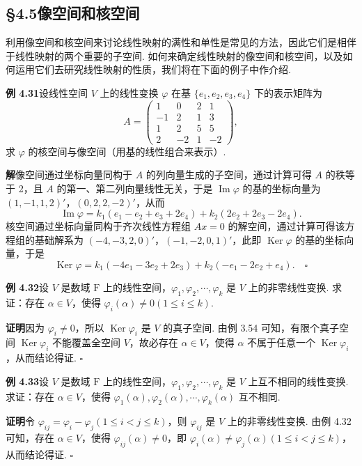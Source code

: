 \documentclass[UTF8,12pt,a4paper,fontset=fandol]{ctexart}
\begin{document}
\subsection*{§4.5\quad 像空间和核空间}

利用像空间和核空间来讨论线性映射的满性和单性是常见的方法，因此它们是相伴于线性映射的两个重要的子空间. 如何来确定线性映射的像空间和核空间，以及如何运用它们去研究线性映射的性质，我们将在下面的例子中作介绍.

\noindent\textbf{例 4.31}\quad 设线性空间 $V$ 上的线性变换 $\varphi$ 在基 $\{e_1,e_2,e_3,e_4\}$ 下的表示矩阵为
\[
A=\left(\begin{array}{rrrr}
1 & 0 & 2 & 1\\
-1 & 2 & 1 & 3\\
1 & 2 & 5 & 5\\
2 & -2 & 1 & -2
\end{array}\right),
\]
求 $\varphi$ 的核空间与像空间（用基的线性组合来表示）.

\noindent\textbf{解}\quad 像空间通过坐标向量同构于 $A$ 的列向量生成的子空间，通过计算可得 $A$ 的秩等于 2，且 $A$ 的第一、第二列向量线性无关，于是 $\operatorname{Im}\varphi$ 的基的坐标向量为 $(1,-1,1,2)'$，$(0,2,2,-2)'$，从而
\[
\operatorname{Im}\varphi=k_1(e_1-e_2+e_3+2e_4)+k_2(2e_2+2e_3-2e_4).
\]
核空间通过坐标向量同构于齐次线性方程组 $Ax=0$ 的解空间，通过计算可得该方程组的基础解系为 $(-4,-3,2,0)'$，$(-1,-2,0,1)'$，此即 $\operatorname{Ker}\varphi$ 的基的坐标向量，于是
\[
\operatorname{Ker}\varphi=k_1(-4e_1-3e_2+2e_3)+k_2(-e_1-2e_2+e_4). \quad \square
\]

\noindent\textbf{例 4.32}\quad 设 $V$ 是数域 $\mathrm{F}$ 上的线性空间，$\varphi_1,\varphi_2,\cdots,\varphi_k$ 是 $V$ 上的非零线性变换. 求证：存在 $\alpha\in V$，使得 $\varphi_i(\alpha)\ne0(1\le i\le k)$.

\noindent\textbf{证明}\quad 因为 $\varphi_i\ne0$，所以 $\operatorname{Ker}\varphi_i$ 是 $V$ 的真子空间. 由例 3.54 可知，有限个真子空间 $\operatorname{Ker}\varphi_i$ 不能覆盖全空间 $V$，故必存在 $\alpha\in V$，使得 $\alpha$ 不属于任意一个 $\operatorname{Ker}\varphi_i$，从而结论得证. $\square$

\noindent\textbf{例 4.33}\quad 设 $V$ 是数域 $\mathrm{F}$ 上的线性空间，$\varphi_1,\varphi_2,\cdots,\varphi_k$ 是 $V$ 上互不相同的线性变换. 求证：存在 $\alpha\in V$，使得 $\varphi_1(\alpha),\varphi_2(\alpha),\cdots,\varphi_k(\alpha)$ 互不相同.

\noindent\textbf{证明}\quad 令 $\varphi_{ij}=\varphi_i-\varphi_j(1\le i<j\le k)$，则 $\varphi_{ij}$ 是 $V$ 上的非零线性变换. 由例 4.32 可知，存在 $\alpha\in V$，使得 $\varphi_{ij}(\alpha)\ne0$，即 $\varphi_i(\alpha)\ne\varphi_j(\alpha)(1\le i<j\le k)$，从而结论得证. $\square$
\end{document}
